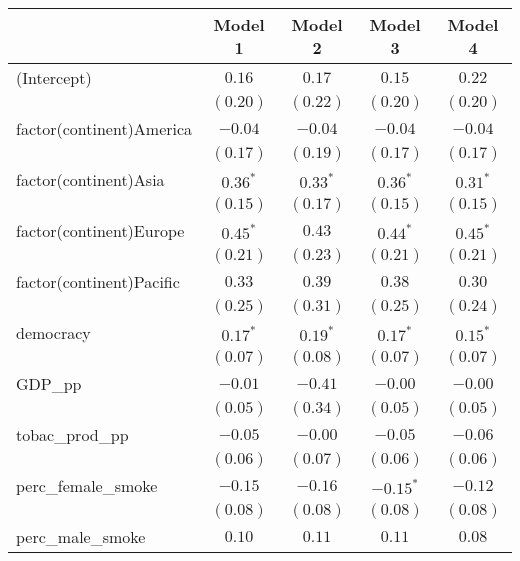 
\begin{table}[!h]
\begin{center}
\begin{tabular}{l c c c c }
\toprule
 & Model 1 & Model 2 & Model 3 & Model 4 \\
\midrule
(Intercept)              & $0.16$       & $0.17$      & $0.15$       & $0.22$       \\
                         & $(0.20)$     & $(0.22)$    & $(0.20)$     & $(0.20)$     \\
factor(continent)America & $-0.04$      & $-0.04$     & $-0.04$      & $-0.04$      \\
                         & $(0.17)$     & $(0.19)$    & $(0.17)$     & $(0.17)$     \\
factor(continent)Asia    & $0.36^{*}$   & $0.33^{*}$  & $0.36^{*}$   & $0.31^{*}$   \\
                         & $(0.15)$     & $(0.17)$    & $(0.15)$     & $(0.15)$     \\
factor(continent)Europe  & $0.45^{*}$   & $0.43$      & $0.44^{*}$   & $0.45^{*}$   \\
                         & $(0.21)$     & $(0.23)$    & $(0.21)$     & $(0.21)$     \\
factor(continent)Pacific & $0.33$       & $0.39$      & $0.38$       & $0.30$       \\
                         & $(0.25)$     & $(0.31)$    & $(0.25)$     & $(0.24)$     \\
democracy                & $0.17^{*}$   & $0.19^{*}$  & $0.17^{*}$   & $0.15^{*}$   \\
                         & $(0.07)$     & $(0.08)$    & $(0.07)$     & $(0.07)$     \\
GDP\_pp                  & $-0.01$      & $-0.41$     & $-0.00$      & $-0.00$      \\
                         & $(0.05)$     & $(0.34)$    & $(0.05)$     & $(0.05)$     \\
tobac\_prod\_pp          & $-0.05$      & $-0.00$     & $-0.05$      & $-0.06$      \\
                         & $(0.06)$     & $(0.07)$    & $(0.06)$     & $(0.06)$     \\
perc\_female\_smoke      & $-0.15$      & $-0.16$     & $-0.15^{*}$  & $-0.12$      \\
                         & $(0.08)$     & $(0.08)$    & $(0.08)$     & $(0.08)$     \\
perc\_male\_smoke        & $0.10$       & $0.11$      & $0.11$       & $0.08$       \\

\end{tabular}
\end{center}
\end{table}

